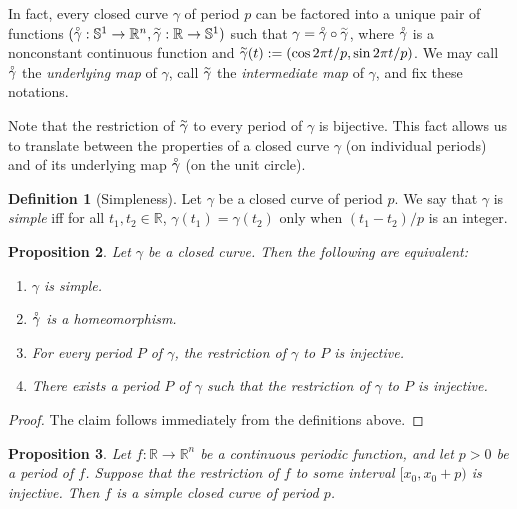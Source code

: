 \documentclass{amsart}
\newtheorem{proposition}{Proposition}[section]
\theoremstyle{definition}
\newtheorem{definition}[proposition]{Definition}
\theoremstyle{remark}
\newcommand{\lring}[1]{\accentset{\circ}{#1}}
\newcommand{\ltilde}[1]{\accentset{\sim}{#1}}
\begin{document}
In fact, every closed curve $\gamma$ of period $p$
can be factored into a unique pair of functions
$(\lring{\gamma}:\mathbb{S}^1\to\mathbb{R}^n,
    \ltilde{\gamma}:\mathbb{R}\to\mathbb{S}^1)$
such that $\gamma=\lring{\gamma}\circ\ltilde{\gamma}$,
where $\lring{\gamma}$ is a nonconstant continuous function
and $\ltilde{\gamma}(t):=(\cos 2\pi t/p,\sin 2\pi t/p)$.
We may call $\lring{\gamma}$ the \emph{underlying map} of $\gamma$,
call $\ltilde{\gamma}$ the \emph{intermediate map} of $\gamma$,
and fix these notations.

Note that the restriction of $\ltilde{\gamma}$ to
every period of $\gamma$ is bijective.
This fact allows us to translate between
the properties of a closed curve $\gamma$
(on individual periods) and of its underlying map
$\lring{\gamma}$ (on the unit circle).

\begin{definition}[Simpleness]
    Let $\gamma$ be a closed curve of period $p$.
    We say that $\gamma$ is \emph{simple}
    iff for all $t_1,t_2\in\mathbb{R}$, $\gamma(t_1)=\gamma(t_2)$
    only when $(t_1-t_2)/p$ is an integer.
\end{definition}

\begin{proposition}
    \label{pro:simple_equiv}
    Let $\gamma$ be a closed curve.
    Then the following are equivalent:
    \begin{enumerate}
        \item $\gamma$ is simple.
        \item $\lring{\gamma}$ is a homeomorphism.
        \item For every period $P$ of $\gamma$, the restriction
              of $\gamma$ to $P$ is injective.
        \item There exists a period $P$ of $\gamma$ such that
              the restriction of $\gamma$ to $P$ is injective.
    \end{enumerate}
\end{proposition}

\begin{proof}
    The claim follows immediately from the definitions above.
\end{proof}

\begin{proposition}
    \label{pro:simple_suf_cond}
    Let $f:\mathbb{R}\to\mathbb{R}^n$
    be a continuous periodic function,
    and let $p>0$ be a period of $f$. Suppose that
    the restriction of $f$ to some interval $[x_0,x_0+p)$
    is injective.
    Then $f$ is a simple closed curve of period $p$.
\end{proposition}
\end{document}
